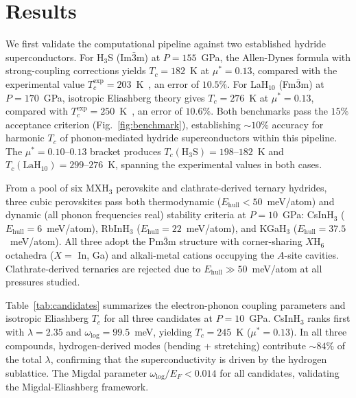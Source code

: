 \section{Results}
\label{sec:results}


We first validate the computational pipeline against two established hydride
superconductors. For H$_3$S (Im$\bar{3}$m) at $P = 155$~GPa, the Allen-Dynes
formula with strong-coupling corrections yields
$T_c = 182$~K at $\mu^* = 0.13$, compared with the experimental value
$T_c^{\mathrm{exp}} = 203$~K~\cite{Drozdov2015}, an error of $10.5\%$.
For LaH$_{10}$ (Fm$\bar{3}$m) at $P = 170$~GPa, isotropic Eliashberg
theory gives $T_c = 276$~K at $\mu^* = 0.13$, compared with
$T_c^{\mathrm{exp}} = 250$~K~\cite{Somayazulu2019}, an error of $10.6\%$.
Both benchmarks pass the $15\%$ acceptance criterion
(Fig.~\ref{fig:benchmark}), establishing $\sim 10\%$ accuracy for
harmonic $T_c$ of phonon-mediated hydride superconductors within this
pipeline. The $\mu^* = 0.10$--$0.13$ bracket produces
$T_c(\mathrm{H}_3\mathrm{S}) = 198$--$182$~K and
$T_c(\mathrm{LaH}_{10}) = 299$--$276$~K, spanning the experimental
values in both cases.


From a pool of six MXH$_3$ perovskite and clathrate-derived ternary
hydrides, three cubic perovskites pass both thermodynamic
($E_{\mathrm{hull}} < 50$~meV/atom) and dynamic (all phonon frequencies
real) stability criteria at $P = 10$~GPa:
CsInH$_3$ ($E_{\mathrm{hull}} = 6$~meV/atom),
RbInH$_3$ ($E_{\mathrm{hull}} = 22$~meV/atom), and
KGaH$_3$ ($E_{\mathrm{hull}} = 37.5$~meV/atom).
All three adopt the Pm$\bar{3}$m structure with corner-sharing
$X$H$_6$ octahedra ($X =$ In, Ga) and alkali-metal cations occupying the
$A$-site cavities. Clathrate-derived ternaries are rejected due to
$E_{\mathrm{hull}} \gg 50$~meV/atom at all pressures studied.


Table~\ref{tab:candidates} summarizes the electron-phonon coupling
parameters and isotropic Eliashberg $T_c$ for all three candidates at
$P = 10$~GPa. CsInH$_3$ ranks first with $\lambda = 2.35$ and
$\omega_{\mathrm{log}} = 99.5$~meV, yielding
$T_c = 245$~K ($\mu^* = 0.13$). In all three compounds, hydrogen-derived
modes (bending + stretching) contribute $\sim 84\%$ of the total
$\lambda$, confirming that the superconductivity is driven by the
hydrogen sublattice. The Migdal parameter
$\omega_{\mathrm{log}}/E_F < 0.014$ for all candidates, validating the
Migdal-Eliashberg framework.

